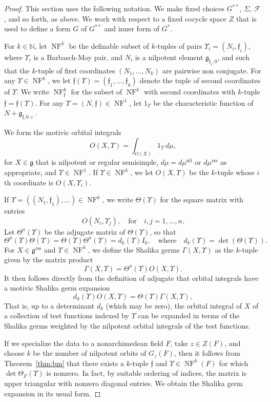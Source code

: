 \documentclass[12pt]{amsart}
\newcommand{\op}[1]{\operatorname{#1}}
\newcommand{\ring}[1]{{\mathbb #1}}
\def\NF{\op{NF}}
\def\Y{\Upsilon}
\def\s{{\mathfrak{f}}}
\newcommand{\cF}{\mathcal{F}}
\newcommand{\fg}{\mathfrak{g}}
\newcommand{\reg}{\mathrm{rss}}
\theoremstyle{plain}
\theoremstyle{definition}
\begin{document}
\begin{proof}
This section uses the following notation.  We make fixed choices
$G^{**}$, $\Sigma$, $\cF$, and so forth, as above.
We work with respect to a fixed cocycle space $Z$ that is used to
define a form $G$ of $G^{**}$ and inner form of $G^*$.

For $k\in \ring{N}$, let $\NF^k$ be the definable subset of $k$-tuples
of pairs $\Y_i=(N_i,\s_i)$, where $\Y_i$ is a Barbasch-Moy pair, and
$N_i$ is a nilpotent element $\fg_{\s_i,0}$, and such that the
$k$-tuple of first coordinates $(N_1,\ldots,N_k)$ are pairwise non
conjugate.  For any $\Y\in \NF^k$, we let $\s(\Y)=(\s_1,\ldots,\s_k)$
denote the tuple of second coordinates of $\Y$.  We write $\NF^k_\s$
for the subset of $\NF^k$ with second coordinates with $k$-tuple
$\s=\s(\Y)$.  For any $\Y=(N,\s)\in \NF^1$, let $1_\Y$ be the
characteristic function of $N+\fg_{\s,0+}$.

We form the motivic orbital integrals
\[
O(X,\Y) = \int_{O(X)} 1_{\Y} \,d\mu,
\]
for $X\in\fg$ that is nilpotent or regular semisimple,
$d\mu=d\mu^{\op{nil}}$ or $d\mu^\reg$ as appropriate, and $\Y\in
\NF^1$.  If $\Y\in \NF^k$, we let $O(X,\Y)$ be the $k$-tuple whose
$i$th coordinate is $O(X,\Y_i)$.

If $\Y=((N_1,\s_1),\ldots)\in \NF^k$, we write $\Theta(\Y)$ for the
square matrix with entries
\[
O(N_i,\Y_j),\quad\text{for}\quad i,j=1,\ldots,n.
\]
Let $\Theta^a(\Y)$ be the adjugate matrix of $\Theta(\Y)$, so that
\[
\Theta^a(\Y) \Theta(\Y) = \Theta(\Y) \Theta^a(\Y) = d_k(\Y)I_k,\quad 
\text{where}\quad d_k(\Y)=\det (\Theta(\Y)). 
\]
For $X\in \fg^\reg$ and $\Y\in \NF^k$, we define the Shalika germs
$\Gamma(X,\Y)$ as the $k$-tuple given by the matrix product
\[
\Gamma (X,\Y) = \Theta^a (\Y) O(X,\Y).
\]
It then follows directly from the
definition of adjugate that orbital integrals have a motivic Shalika
germ expansion
\[
d_k(\Y) O(X,\Y) = \Theta(\Y)\Gamma(X,\Y),
\]
That is, up to a determinant $d_k$ (which may be zero), the orbital
integral of $X$ of a collection of test functions indexed by $\Y$ can
be expanded in terms of the Shalika germs weighted by the nilpotent
orbital integrals of the test functions.


If we specialize the data to a nonarchimedean field $F$, take $z\in
Z(F)$, and choose $k$ be the number of nilpotent orbits of $G_z(F)$,
then it follows from Theorem~\ref{thm:bm} that there exists a
$k$-tuple $\s$ and $\Y\in \NF^k(F)$ for which $\det\Theta_F(\Y)$ is
nonzero. In fact, by suitable ordering of indices, the matrix is upper
triangular with nonzero diagonal entries.  We obtain the Shalika germ
expansion in its usual form.
\end{proof}
\end{document}
